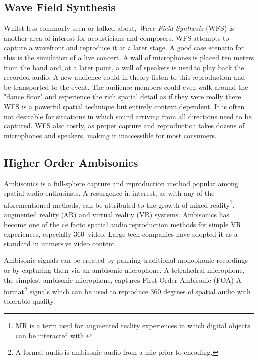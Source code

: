 

\subsection{Wave Field Synthesis}
\label{subsec:wfs}


Whilst less commonly seen or talked about, \textit{Wave Field Synthesis} (WFS) is another area of interest for acousticians and composers. WFS attempts to capture a wavefront and reproduce it at a later stage. A good case scenario for this is the simulation of a live concert. A wall of microphones is placed ten meters from the band and, at a later point, a wall of speakers is used to play back the recorded audio. A new audience could in theory listen to this reproduction and be transported to the event. The audience members could even walk around the "dance floor" and experience the rich spatial detail as if they were really there. WFS is a powerful spatial technique but entirely context dependent. It is often not desirable for situations in which sound arriving from all directions need to be captured. WFS also costly, as proper capture and reproduction takes dozens of microphones and speakers, making it inaccessible for most consumers.

\subsection{Higher Order Ambisonics}
\label{subsec:ambi}

Ambisonics is a full-sphere capture and reproduction method popular among spatial audio enthusiasts. A resurgence in interest, as with any of the aforementioned methods, can be attributed to the growth of mixed reality\footnote{MR is a term used for augmented reality experiences in which digital objects can be interacted with.}, augmented reality (AR) and virtual reality (VR) systems. Ambisonics has become one of the de facto spatial audio reproduction methods for simple VR experiences, especially 360\textdegree \ video. Large tech companies have adopted it as a standard in immersive video content.  

Ambisonic signals can be created by panning traditional monophonic recordings or by capturing them via an ambisonic microphone. A tetrahedral microphone, the simplest ambisonic microphone, captures First Order Ambisonic (FOA) A-format\footnote{A-format audio is ambisonic audio from a mic prior to encoding.} signals which can be used to reproduce 360 degrees of spatial audio with tolerable quality. 

